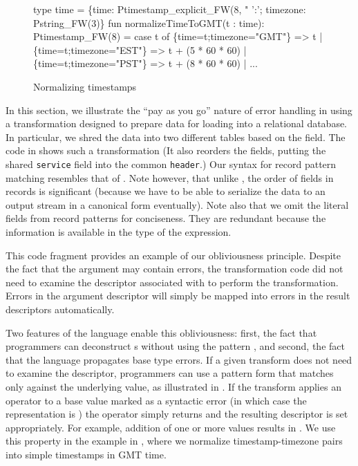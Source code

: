 \begin{figure}
  \centering
  \begin{code}
type time = 
  \{time: Ptimestamp_explicit_FW(8, "%
   ':'; timezone: Pstring_FW(3)\}
\mbox{}
fun normalizeTimeToGMT(t : time): Ptimestamp_FW(8) =
    case t of
      \{time=t;timezone="GMT"\} => t
    | \{time=t;timezone="EST"\} => t + (5 * 60 * 60)
    | \{time=t;timezone="PST"\} => t + (8 * 60 * 60)
    | ...    
  \end{code}
  \caption{Normalizing timestamps}
  \label{fig:ex-normalize}
\end{figure}
In this section, we illustrate the ``pay as you go'' nature of error handling in \datatype{} using a transformation designed to prepare \darkstar{} data for loading into a relational database.  In particular, we shred the data into two different tables based on the  field.  
The code in  shows such a transformation
(It also reorders the fields, putting the shared \texttt{service} field into the common \texttt{header}.)  Our syntax for record pattern matching resembles that of \sml{}.  Note however, that unlike \sml{}, the order of fields in \datatype{} records is significant (because we have to be able to serialize the data to an output stream in a canonical form eventually).  Note also that we omit the literal fields from \datatype{} record patterns for conciseness.  They are redundant because the information is available in the type of the expression.

This code fragment provides an example of our obliviousness principle.  Despite the fact that the argument  may contain errors, the transformation code did not need to examine the descriptor associated with  to perform the transformation.  Errors in the argument descriptor will simply be mapped into errors in the result descriptors automatically.

Two features of the language enable this obliviousness: first, the fact that programmers can deconstruct \pvalue{}s without using the pattern 
, and second, the fact that the language propagates base type errors.  If a given transform does not need to examine the descriptor, programmers can use a pattern form that matches only against the underlying value, as illustrated in .  If the transform applies an operator to a base value marked as a syntactic error (in which case the representation is \btm{}) the operator simply returns \btm{} and the resulting descriptor is set appropriately. 
For example, addition of one or more \btm{} values results
in \btm{}. We use this property in the example in
, where we normalize timestamp-timezone pairs
into simple timestamps in GMT time.




